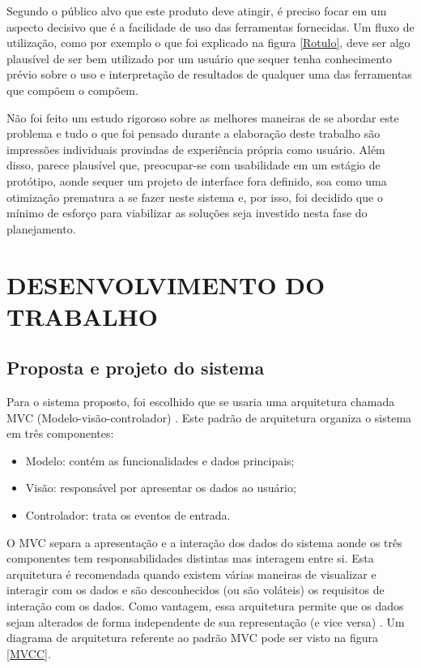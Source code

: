 \documentclass{abnt}
\begin{document}
Segundo o público alvo que este produto deve atingir, é preciso focar em um
aspecto decisivo que é a facilidade de uso das ferramentas fornecidas. Um fluxo
de utilização, como por exemplo o que foi explicado na figura \ref{Rotulo}, deve
ser algo plausível de ser bem utilizado por um usuário que sequer tenha
conhecimento prévio sobre o uso e interpretação de resultados de qualquer uma
das ferramentas que compõem o compõem.

Não foi feito um estudo rigoroso sobre as melhores maneiras de se abordar este
problema e tudo o que foi pensado durante a elaboração deste trabalho são
impressões individuais provindas de experiência própria como usuário. Além
disso, parece plausível que, preocupar-se com usabilidade em um estágio de
protótipo, aonde sequer um projeto de interface fora definido, soa como uma
otimização prematura a se fazer neste sistema e, por isso, foi decidido que o
mínimo de esforço para viabilizar as soluções seja investido nesta fase do
planejamento.

\chapter{DESENVOLVIMENTO DO TRABALHO}

\section{Proposta e projeto do sistema}

Para o sistema proposto, foi escolhido que se usaria uma arquitetura chamada MVC
(Modelo-visão-controlador) \cite{patternMVC}. Este padrão de arquitetura
organiza o sistema em três componentes:

\begin{itemize}
	\item Modelo: contém as funcionalidades e dados principais;
	\item Visão:  responsável por apresentar os dados ao usuário;
	\item Controlador: trata os eventos de entrada.
\end{itemize}

O MVC separa a apresentação e a interação dos dados do sistema aonde os três
componentes tem responsabilidades distintas mas interagem entre si. Esta
arquitetura é recomendada quando existem várias maneiras de visualizar e
interagir com os dados e são desconhecidos (ou são voláteis) os requisitos de
interação com os dados. Como vantagem, essa arquitetura permite que os dados
sejam alterados de forma independente de sua representação (e vice versa)  
\cite{patternMVC}. Um diagrama de arquitetura referente ao padrão MVC pode ser
visto na figura \ref{MVCC}.
\end{document}
